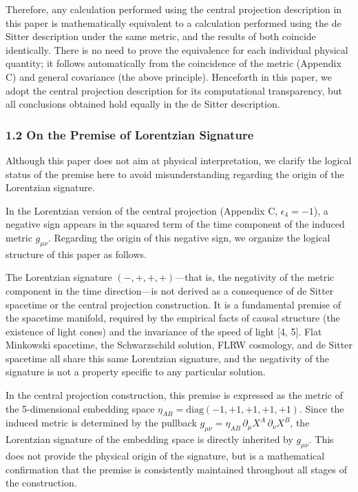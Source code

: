 \documentclass[a4paper,11pt]{article}
\theoremstyle{definition}
\begin{document}
Therefore, any calculation performed using the central projection description in this paper is mathematically equivalent to a calculation performed using the de Sitter description under the same metric, and the results of both coincide identically. There is no need to prove the equivalence for each individual physical quantity; it follows automatically from the coincidence of the metric (Appendix C) and general covariance (the above principle). Henceforth in this paper, we adopt the central projection description for its computational transparency, but all conclusions obtained hold equally in the de Sitter description.

\subsubsection{1.2 On the Premise of Lorentzian Signature}\label{on-the-premise-of-lorentzian-signature}

Although this paper does not aim at physical interpretation, we clarify the logical status of the premise here to avoid misunderstanding regarding the origin of the Lorentzian signature.

In the Lorentzian version of the central projection (Appendix C, \(\epsilon_4 = -1\)), a negative sign appears in the squared term of the time component of the induced metric \(g_{\mu\nu}\). Regarding the origin of this negative sign, we organize the logical structure of this paper as follows.

The Lorentzian signature \((-,+,+,+)\)---that is, the negativity of the metric component in the time direction---is not derived as a consequence of de Sitter spacetime or the central projection construction. It is a fundamental premise of the spacetime manifold, required by the empirical facts of causal structure (the existence of light cones) and the invariance of the speed of light {[}4, 5{]}. Flat Minkowski spacetime, the Schwarzschild solution, FLRW cosmology, and de Sitter spacetime all share this same Lorentzian signature, and the negativity of the signature is not a property specific to any particular solution.

In the central projection construction, this premise is expressed as the metric of the 5-dimensional embedding space \(\eta_{AB} = \mathrm{diag}(-1,+1,+1,+1,+1)\). Since the induced metric is determined by the pullback \(g_{\mu\nu} = \eta_{AB}\,\partial_\mu X^A\,\partial_\nu X^B\), the Lorentzian signature of the embedding space is directly inherited by \(g_{\mu\nu}\). This does not provide the physical origin of the signature, but is a mathematical confirmation that the premise is consistently maintained throughout all stages of the construction.
\end{document}
